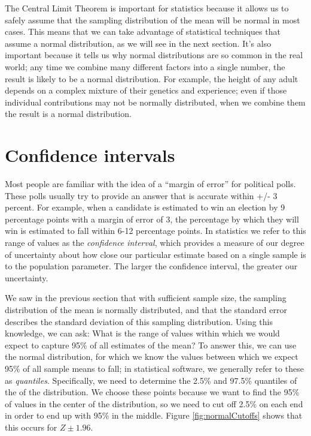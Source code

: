 \documentclass[12pt,]{book}
\theoremstyle{definition}
\theoremstyle{definition}
\theoremstyle{definition}
\theoremstyle{remark}
\begin{document}
The Central Limit Theorem is important for statistics because it allows us to safely assume that the sampling distribution of the mean will be normal in most cases. This means that we can take advantage of statistical techniques that assume a normal distribution, as we will see in the next section. It's also important because it tells us why normal distributions are so common in the real world; any time we combine many different factors into a single number, the result is likely to be a normal distribution. For example, the height of any adult depends on a complex mixture of their genetics and experience; even if those individual contributions may not be normally distributed, when we combine them the result is a normal distribution.

\hypertarget{confidence-intervals}{%
\section{Confidence intervals}\label{confidence-intervals}}

Most people are familiar with the idea of a ``margin of error'' for political polls. These polls usually try to provide an answer that is accurate within +/- 3 percent. For example, when a candidate is estimated to win an election by 9 percentage points with a margin of error of 3, the percentage by which they will win is estimated to fall within 6-12 percentage points. In statistics we refer to this range of values as the \emph{confidence interval}, which provides a measure of our degree of uncertainty about how close our particular estimate based on a single sample is to the population parameter. The larger the confidence interval, the greater our uncertainty.

We saw in the previous section that with sufficient sample size, the sampling distribution of the mean is normally distributed, and that the standard error describes the standard deviation of this sampling distribution. Using this knowledge, we can ask: What is the range of values within which we would expect to capture 95\% of all estimates of the mean? To answer this, we can use the normal distribution, for which we know the values between which we expect 95\% of all sample means to fall; in statistical software, we generally refer to these as \emph{quantiles}. Specifically, we need to determine the 2.5\% and 97.5\% quantiles of the of the distribution. We choose these points because we want to find the 95\% of values in the center of the distribution, so we need to cut off 2.5\% on each end in order to end up with 95\% in the middle. Figure \ref{fig:normalCutoffs} shows that this occurs for \(Z \pm 1.96\).
\end{document}
